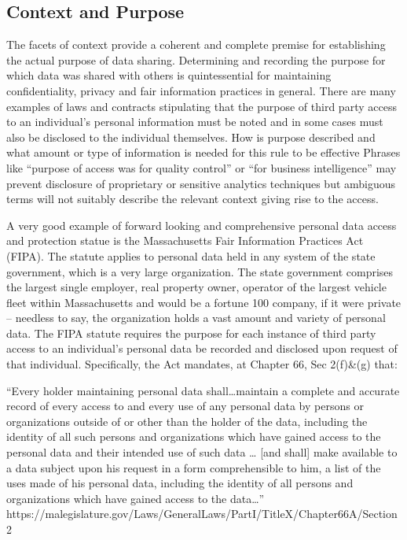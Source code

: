 \subsection{Context and Purpose}

The facets of context provide a coherent and complete premise for establishing the actual purpose of data sharing.
Determining and recording the purpose for which data was shared with others is quintessential for maintaining confidentiality, privacy and fair information practices in general.
There are many examples of laws and contracts stipulating that the purpose of third party access to an individual’s personal information must be noted and in some cases must also be disclosed to the individual themselves.
How is purpose described and what amount or type of information is needed for this rule to be effective
Phrases like “purpose of access was for quality control” or “for business intelligence” may prevent disclosure of proprietary or sensitive analytics techniques but ambiguous terms will not suitably describe the relevant context giving rise to the access.

A very good example of forward looking and comprehensive personal data access and protection statue is the Massachusetts Fair Information Practices Act (FIPA).
The statute applies to personal data held in any system of the state government, which is a very large organization.
The state government comprises the largest single employer, real property owner, operator of the largest vehicle fleet within Massachusetts and would be a fortune 100 company, if it were private – needless to say, the organization holds a vast amount and variety of personal data.
The FIPA statute requires the purpose for each instance of third party access to an individual’s personal data be recorded and disclosed upon request of that individual. Specifically, the Act mandates, at Chapter 66, Sec 2(f)\&(g) that:

“Every holder maintaining personal data shall…maintain a complete and accurate record of every access to and every use of any personal data by persons or organizations outside of or other than the holder of the data, including the identity of all such persons and organizations which have gained access to the personal data and their intended use of such data … [and shall] make available to a data subject upon his request in a form comprehensible to him, a list of the uses made of his personal data, including the identity of all persons and organizations which have gained access to the data…” https://malegislature.gov/Laws/GeneralLaws/PartI/TitleX/Chapter66A/Section2

